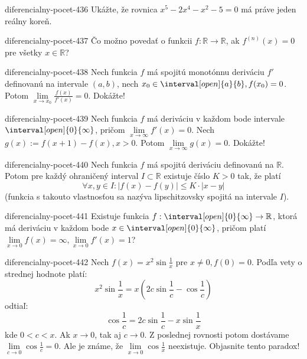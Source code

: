 \begin{defproblem}{diferencialny-pocet-436}
Ukážte, že rovnica $x^5-2x^4-x^2-5=0$ má práve jeden reálny koreň.
\end{defproblem}

\begin{defproblem}{diferencialny-pocet-437}
Čo možno povedať o funkcii $f:\mathbb{R}\rightarrow\mathbb{R}$, ak
$f^{(n)}(x)=0$ pre všetky $x\in\mathbb{R}$?
\end{defproblem}

\begin{defproblem}{diferencialny-pocet-438}
Nech funkcia $f$ má spojitú monotónnu deriváciu $f'$ definovanú na intervale
$(a,b)$, nech $x_0\in \interval[open]{a}{b},f(x_0)=0$. Potom
$\lim\limits_{x\rightarrow x_0}\frac{f(x)}{f'(x)}=0$. Dokážte!
\end{defproblem}

\begin{defproblem}{diferencialny-pocet-439}
Nech funkcia $f$ má deriváciu v každom bode intervale
$\interval[open]{0}{\infty}$, pričom $\lim\limits_{x\rightarrow \infty}f'(x)=0$.
Nech $g(x):=f(x+1)-f(x),x>0$. Potom $\lim\limits _{x\rightarrow \infty}g(x)=0$.
Dokážte!
\end{defproblem}

\begin{defproblem}{diferencialny-pocet-440}
Nech funkcia $f$ má spojitú deriváciu definovanú na $\mathbb{R}$. Potom pre
každý ohraničený interval $I \subset \mathbb{R}$ existuje číslo $K>0$ tak, že
platí
\[
  \forall x,y\in I: |f(x)-f(y)|\leq K\cdot |x-y|
\]
(funkcia s takouto vlastnosťou sa nazýva lipschitzovsky spojitá na intervale
$I$).
\end{defproblem}

\begin{defproblem}{diferencialny-pocet-441}
Existuje funkcia $f:\interval[open]{0}{\infty}\rightarrow\mathbb{R}$, ktorá má
deriváciu v každom bode $x\in \interval[open]{0}{\infty}$, pričom platí
$\lim\limits_{x\rightarrow 0}f(x)=\infty,\lim\limits_{x\rightarrow 0}f'(x)=1$?
\end{defproblem}

\begin{defproblem}{diferencialny-pocet-442}
Nech $f(x)=x^2\sin \frac{1}{x}$ pre $x\neq 0,f(0)=0$. Podľa vety o strednej
hodnote platí:
\[
  x^2\sin \frac{1}{x}=x(2 c \sin \frac{1}{c}-\cos \frac{1}{c})
\]
odtiaľ:
\[
  \cos \frac{1}{c}=2c\sin \frac{1}{c}-x\sin \frac{1}{x}
\]
kde $0<c<x$. Ak $x\rightarrow 0$, tak aj $c\rightarrow 0$. Z poslednej rovnosti
potom dostávame $\lim\limits_{c\rightarrow 0}\cos \frac{1}{c}=0$. Ale je známe,
že $\lim\limits_{x\rightarrow 0}\cos \frac{1}{x}$ neexistuje. Objasnite tento
paradox!
\end{defproblem}

